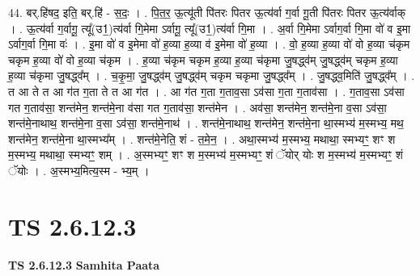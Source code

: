 \documentclass[17pt]{extarticle}
\begin{document}
44. बर्.हि॑षद॒ इति॒ बर्.हि॑ - स॒दः॒ । . पि॒त॒र॒ ऊ॒त्यू॑ती पि॑तरः पितर ऊ॒त्य॑र्वा ग॒र्वा गू॒ती पि॑तरः पितर ऊ॒त्य॑र्वाक् । . ऊ॒त्य॑र्वा ग॒र्वागू॒ त्यू᳚(उ1॒)त्य॑र्वा गि॒मेमा ऽर्वागू॒ त्यू᳚(उ1॒)त्य॑र्वा गि॒मा । . अ॒र्वा गि॒मेमा ऽर्वाग॒र्वा गि॒मा वो॑ व इ॒मा ऽर्वाग॒र्वा गि॒मा वः॑ । . इ॒मा वो॑ व इ॒मेमा वो॑ ह॒व्या ह॒व्या व॑ इ॒मेमा वो॑ ह॒व्या । . वो॒ ह॒व्या ह॒व्या वो॑ वो ह॒व्या च॑कृम चकृम ह॒व्या वो॑ वो ह॒व्या च॑कृम । . ह॒व्या च॑कृम चकृम ह॒व्या ह॒व्या च॑कृमा जु॒षद्ध्व॑म् जु॒षद्ध्व॑म् चकृम ह॒व्या ह॒व्या च॑कृमा जु॒षद्ध्व᳚म् । . च॒कृ॒मा॒ जु॒षद्ध्व॑म् जु॒षद्ध्व॑म् चकृम चकृमा जु॒षद्ध्व᳚म् । . जु॒षद्ध्व॒मिति॑ जु॒षद्ध्व᳚म् । . त आ ते त आ ग॑त ग॒ता ते त आ ग॑त । . आ ग॑त ग॒ता ग॒ताव॒सा ऽव॑सा ग॒ता ग॒ताव॑सा । . ग॒ताव॒सा ऽव॑सा गत ग॒ताव॑सा॒ शन्त॑मेन॒ शन्त॑मे॒ना व॑सा गत ग॒ताव॑सा॒ शन्त॑मेन । . अव॑सा॒ शन्त॑मेन॒ शन्त॑मे॒ना व॒सा ऽव॑सा॒ शन्त॑मे॒नाथाथ॒ शन्त॑मे॒ना व॒सा ऽव॑सा॒ शन्त॑मे॒नाथ॑ । . शन्त॑मे॒नाथाथ॒ शन्त॑मेन॒ शन्त॑मे॒ना था॒स्मभ्य॑ म॒स्मभ्य॒ मथ॒ शन्त॑मेन॒ शन्त॑मे॒ना था॒स्मभ्य᳚म् । . शन्त॑मे॒नेति॒ शं - त॒मे॒न॒ । . अथा॒स्मभ्य॑ म॒स्मभ्य॒ मथाथा॒ स्मभ्यꣳ॒॒ शꣳ श म॒स्मभ्य॒ मथाथा॒ स्मभ्यꣳ॒॒ शम् । . अ॒स्मभ्यꣳ॒॒ शꣳ श म॒स्मभ्य॑ म॒स्मभ्यꣳ॒॒ शं ॅयोर् योः श म॒स्मभ्य॑ म॒स्मभ्यꣳ॒॒ शं ॅयोः । . अ॒स्मभ्य॒मित्य॒स्म - भ्य॒म् । \newline
\pagebreak
{}

\section{ TS 2.6.12.3 }

\textbf{TS 2.6.12.3 } \newline
\textbf{Samhita Paata} \newline
\end{document}
